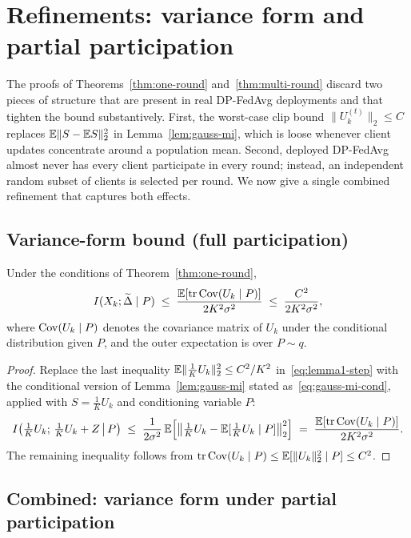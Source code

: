 \section{Refinements: variance form and partial participation}\label{sec:refine}

The proofs of Theorems~\ref{thm:one-round} and~\ref{thm:multi-round} discard two pieces of structure that are present in real DP-FedAvg deployments and that tighten the bound substantively. First, the worst-case clip bound \(\|U_k^{(t)}\|_2\le C\) replaces \(\mathbb{E}\|S-\mathbb{E} S\|_2^2\) in Lemma~\ref{lem:gauss-mi}, which is loose whenever client updates concentrate around a population mean. Second, deployed DP-FedAvg almost never has every client participate in every round; instead, an independent random subset of clients is selected per round. We now give a single combined refinement that captures both effects.

\subsection{Variance-form bound (full participation)}

\begin{theorem}\label{thm:var-one-round}
Under the conditions of Theorem~\ref{thm:one-round},
\begin{equation}\label{eq:var-one-round}
I(X_k;\widetilde{\Delta}\mid P)\;\le\;\frac{\mathbb{E}\!\left[\operatorname{tr}\operatorname{Cov}(U_k\mid P)\right]}{2K^2\sigma^2}\;\le\;\frac{C^2}{2K^2\sigma^2},
\end{equation}
where \(\operatorname{Cov}(U_k\mid P)\) denotes the covariance matrix of \(U_k\) under the conditional distribution given \(P\), and the outer expectation is over \(P\sim q\).
\end{theorem}

\begin{proof}
Replace the last inequality \(\mathbb{E}\|\tfrac{1}{K}U_k\|_2^2\le C^2/K^2\) in~\eqref{eq:lemma1-step} with the conditional version of Lemma~\ref{lem:gauss-mi} stated as~\eqref{eq:gauss-mi-cond}, applied with \(S=\tfrac{1}{K}U_k\) and conditioning variable \(P\):
\[
I\!\left(\tfrac{1}{K}U_k;\,\tfrac{1}{K}U_k+Z\,\middle|\,P\right)\;\le\;\frac{1}{2\sigma^2}\,\mathbb{E}\!\left[\bigl\|\tfrac{1}{K}U_k-\mathbb{E}[\tfrac{1}{K}U_k\mid P]\bigr\|_2^2\right]\;=\;\frac{\mathbb{E}[\operatorname{tr}\operatorname{Cov}(U_k\mid P)]}{2K^2\sigma^2}.
\]
The remaining inequality follows from \(\operatorname{tr}\operatorname{Cov}(U_k\mid P)\le\mathbb{E}[\|U_k\|_2^2\mid P]\le C^2\).
\end{proof}

\subsection{Combined: variance form under partial participation}

